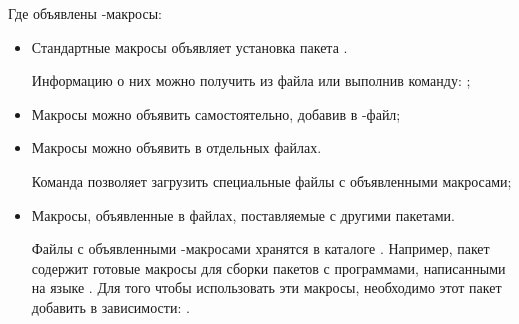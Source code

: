 Где объявлены -макросы:
\begin{itemize}
	\item Стандартные макросы объявляет установка пакета .
	 
	 Информацию о них можно получить из файла  или выполнив команду: ;
	 
	 \item Макросы можно объявить самостоятельно, добавив в -файл;
	 
	 \item Макросы можно объявить в отдельных файлах.
	 
	 Команда  позволяет загрузить специальные файлы с объявленными макросами;
	 
	 \item Макросы, объявленные в файлах, поставляемые с другими пакетами.
	 
	 Файлы с объявленными -макросами хранятся в каталоге .
	 Например, пакет  содержит готовые макросы для сборки пакетов с программами, написанными на языке .
	 Для того чтобы использовать эти макросы, необходимо этот пакет добавить в зависимости:
	 .
\end{itemize}


